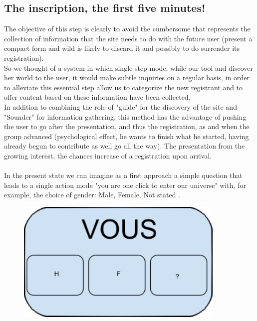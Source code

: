 \documentclass {life-en}
\begin{document}
\subsection{The inscription, the first five minutes!}

The objective of this step is clearly to avoid the cumbersome that represents the collection of information that the site needs to do with the future user (present a compact form and wild is likely to discard it and possibly to do surrender its registration).\\

So we thought of a system in which single-step mode, while our tool and discover her world to the user, it would make subtle inquiries on a regular basis, in order to alleviate this essential step allow us to categorize the new registrant and to offer content based on these information have been collected.\\

In addition to combining the role of "guide" for the discovery of the site and "Sounder" for information gathering, this method has the advantage of pushing the user to go after the presentation, and thus the registration, as and when the group advanced (psychological effect, he wants to finish what he started, having already begun to contribute as well go all the way). The presentation from the growing interest, the chances increase of a registration upon arrival.\\
\\

In the present state we can imagine as a first approach a simple question that leads to a single action mode "you are one click to enter our universe" with, for example, the choice of gender: Male, Female, Not stated .

\begin{figure} [H]
  \begin{center}
    \includegraphics [width = 10cm]{img/vous.png}
  \end{center}
\end{figure}
\end{document}
